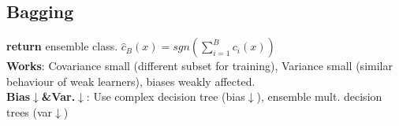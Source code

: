 \subsection*{Bagging}
\textbf{return} ensemble class. $\hat{c}_B(x)=sgn(\sum_{i=1}^{B} c_i(x))$\\
\textbf{Works}: Covariance small (different subset for training), Variance small (similar behaviour of weak learners), biases weakly affected.\\
\textbf{Bias$\downarrow$\&Var.$\downarrow$}: Use complex decision tree (bias$\downarrow$), ensemble mult. decision trees (var$\downarrow$)
